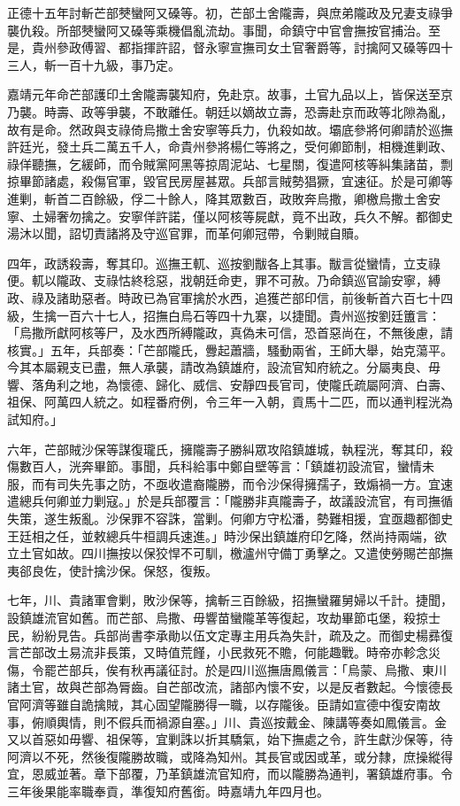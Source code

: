 \begin{pinyinscope}
正德十五年討斬芒部僰蠻阿又磉等。初，芒部土舍隴壽，與庶弟隴政及兄妻支祿爭襲仇殺。所部僰蠻阿又磉等乘機倡亂流劫。事聞，命鎮守中官會撫按官捕治。至是，貴州參政傅習、都指揮許詔，督永寧宣撫司女土官奢爵等，討擒阿又磉等四十三人，斬一百十九級，事乃定。

嘉靖元年命芒部護印土舍隴壽襲知府，免赴京。故事，土官九品以上，皆保送至京乃襲。時壽、政等爭襲，不敢離任。朝廷以嫡故立壽，恐壽赴京而政等北隙為亂，故有是命。然政與支祿倚烏撒土舍安寧等兵力，仇殺如故。壩底參將何卿請於巡撫許廷光，發土兵二萬五千人，命貴州參將楊仁等將之，受何卿節制，相機進剿政、祿佯聽撫，乞緩師，而令賊黨阿黑等掠周泥站、七星關，復遣阿核等糾集諸苗，剽掠畢節諸處，殺傷官軍，毀官民房屋甚眾。兵部言賊勢猖獗，宜速征。於是可卿等進剿，斬首二百餘級，俘二十餘人，降其眾數百，政敗奔烏撒，卿檄烏撒土舍安寧、土婦奢勿擒之。安寧佯許諾，僅以阿核等屍獻，竟不出政，兵久不解。都御史湯沐以聞，詔切責諸將及守巡官罪，而革何卿冠帶，令剿賊自贖。

四年，政誘殺壽，奪其印。巡撫王軏、巡按劉黻各上其事。黻言從蠻情，立支祿便。軏以隴政、支祿怙終稔惡，戕朝廷命吏，罪不可赦。乃命鎮巡官諭安寧，縛政、祿及諸助惡者。時政已為官軍擒於水西，追獲芒部印信，前後斬首六百七十四級，生擒一百六十七人，招撫白烏石等四十九寨，以捷聞。貴州巡按劉廷簠言：「烏撒所獻阿核等尸，及水西所縛隴政，真偽未可信，恐首惡尚在，不無後慮，請核實。」五年，兵部奏：「芒部隴氏，釁起蕭牆，騷動兩省，王師大舉，始克蕩平。今其本屬親支已盡，無人承襲，請改為鎮雄府，設流官知府統之。分屬夷良、毋響、落角利之地，為懷德、歸化、威信、安靜四長官司，使隴氏疏屬阿濟、白壽、祖保、阿萬四人統之。如程番府例，令三年一入朝，貢馬十二匹，而以通判程洸為試知府。」

六年，芒部賊沙保等謀復瓏氏，擁隴壽子勝糾眾攻陷鎮雄城，執程洸，奪其印，殺傷數百人，洸奔畢節。事聞，兵科給事中鄭自壁等言：「鎮雄初設流官，蠻情未服，而有司失先事之防，不亟收遣裔隴勝，而令沙保得擁孺子，致煽禍一方。宜速遣總兵何卿並力剿寇。」於是兵部覆言：「隴勝非真隴壽子，故議設流官，有司撫循失策，遂生叛亂。沙保罪不容誅，當剿。何卿方守松潘，勢難相援，宜亟趣都御史王廷相之任，並敕總兵牛桓調兵速進。」時沙保出鎮雄府印乞降，然尚持兩端，欲立土官如故。四川撫按以保狡悍不可馴，檄瀘州守備丁勇擊之。又遣使勞賜芒部撫夷郤良佐，使計擒沙保。保怒，復叛。

七年，川、貴諸軍會剿，敗沙保等，擒斬三百餘級，招撫蠻羅舅婦以千計。捷聞，設鎮雄流官如舊。而芒部、烏撒、毋響苗蠻隴革等復起，攻劫畢節屯堡，殺掠士民，紛紛見告。兵部尚書李承勛以伍文定專主用兵為失計，疏及之。而御史楊彞復言芒部改土易流非長策，又時值荒饉，小民救死不贍，何能趣戰。時帝亦軫念災傷，令罷芒部兵，俟有秋再議征討。於是四川巡撫唐鳳儀言：「烏蒙、烏撒、東川諸土官，故與芒部為脣齒。自芒部改流，諸部內懷不安，以是反者數起。今懷德長官阿濟等雖自詭擒賊，其心固望隴勝得一職，以存隴後。臣請如宣德中復安南故事，俯順輿情，則不假兵而禍源自塞。」川、貴巡按戴金、陳講等奏如鳳儀言。金又以首惡如毋響、祖保等，宜剿誅以折其驕氣，始下撫處之令，許生獻沙保等，待阿濟以不死，然後復隴勝故職，或降為知州。其長官或因或革，或分隸，庶操縱得宜，恩威並著。章下部覆，乃革鎮雄流官知府，而以隴勝為通判，署鎮雄府事。令三年後果能率職奉貢，準復知府舊銜。時嘉靖九年四月也。


\end{pinyinscope}
